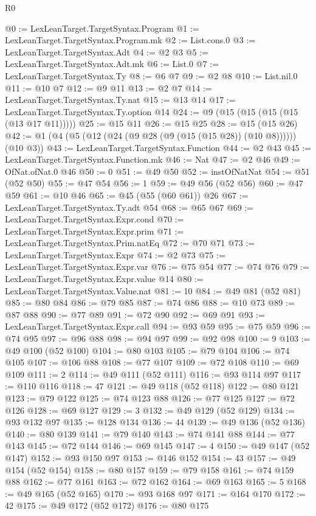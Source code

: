 \begin{lexlean}{R0}
\begin{coremodule}
@0 := LexLeanTarget.TargetSyntax.Program
@1 := LexLeanTarget.TargetSyntax.Program.mk
@2 := List.cons.{0}
@3 := LexLeanTarget.TargetSyntax.Adt
@4 := @2 @3
@5 := LexLeanTarget.TargetSyntax.Adt.mk
@6 := List.{0}
@7 := LexLeanTarget.TargetSyntax.Ty
@8 := @6 @7
@9 := @2 @8
@10 := List.nil.{0}
@11 := @10 @7
@12 := @9 @11
@13 := @2 @7
@14 := LexLeanTarget.TargetSyntax.Ty.nat
@15 := @13 @14
@17 := LexLeanTarget.TargetSyntax.Ty.option @14
@24 := @9 (@15 (@15 (@15 (@15 (@13 @17 @11)))))
@25 := @15 @11
@26 := @15 @25
@28 := @15 (@15 @26)
@42 := @1 (@4 (@5 (@12 (@24 (@9 @28 (@9 (@15 (@15 @28)) (@10 @8)))))) (@10 @3))
@43 := LexLeanTarget.TargetSyntax.Function
@44 := @2 @43
@45 := LexLeanTarget.TargetSyntax.Function.mk
@46 := Nat
@47 := @2 @46
@49 := OfNat.ofNat.{0} @46
@50 := 0
@51 := @49 @50
@52 := instOfNatNat
@54 := @51 (@52 @50)
@55 := @47 @54
@56 := 1
@59 := @49 @56 (@52 @56)
@60 := @47 @59
@61 := @10 @46
@65 := @45 (@55 (@60 @61)) @26
@67 := LexLeanTarget.TargetSyntax.Ty.adt @54
@68 := @65 @67
@69 := LexLeanTarget.TargetSyntax.Expr.cond
@70 := LexLeanTarget.TargetSyntax.Expr.prim
@71 := LexLeanTarget.TargetSyntax.Prim.natEq
@72 := @70 @71
@73 := LexLeanTarget.TargetSyntax.Expr
@74 := @2 @73
@75 := LexLeanTarget.TargetSyntax.Expr.var
@76 := @75 @54
@77 := @74 @76
@79 := LexLeanTarget.TargetSyntax.Expr.value @14
@80 := LexLeanTarget.TargetSyntax.Value.nat
@81 := 10
@84 := @49 @81 (@52 @81)
@85 := @80 @84
@86 := @79 @85
@87 := @74 @86
@88 := @10 @73
@89 := @87 @88
@90 := @77 @89
@91 := @72 @90
@92 := @69 @91
@93 := LexLeanTarget.TargetSyntax.Expr.call
@94 := @93 @59
@95 := @75 @59
@96 := @74 @95
@97 := @96 @88
@98 := @94 @97
@99 := @92 @98
@100 := 9
@103 := @49 @100 (@52 @100)
@104 := @80 @103
@105 := @79 @104
@106 := @74 @105
@107 := @106 @88
@108 := @77 @107
@109 := @72 @108
@110 := @69 @109
@111 := 2
@114 := @49 @111 (@52 @111)
@116 := @93 @114 @97
@117 := @110 @116
@118 := 47
@121 := @49 @118 (@52 @118)
@122 := @80 @121
@123 := @79 @122
@125 := @74 @123 @88
@126 := @77 @125
@127 := @72 @126
@128 := @69 @127
@129 := 3
@132 := @49 @129 (@52 @129)
@134 := @93 @132 @97
@135 := @128 @134
@136 := 44
@139 := @49 @136 (@52 @136)
@140 := @80 @139
@141 := @79 @140
@143 := @74 @141 @88
@144 := @77 @143
@145 := @72 @144
@146 := @69 @145
@147 := 4
@150 := @49 @147 (@52 @147)
@152 := @93 @150 @97
@153 := @146 @152
@154 := 43
@157 := @49 @154 (@52 @154)
@158 := @80 @157
@159 := @79 @158
@161 := @74 @159 @88
@162 := @77 @161
@163 := @72 @162
@164 := @69 @163
@165 := 5
@168 := @49 @165 (@52 @165)
@170 := @93 @168 @97
@171 := @164 @170
@172 := 42
@175 := @49 @172 (@52 @172)
@176 := @80 @175

\end{coremodule}
\end{lexlean}
